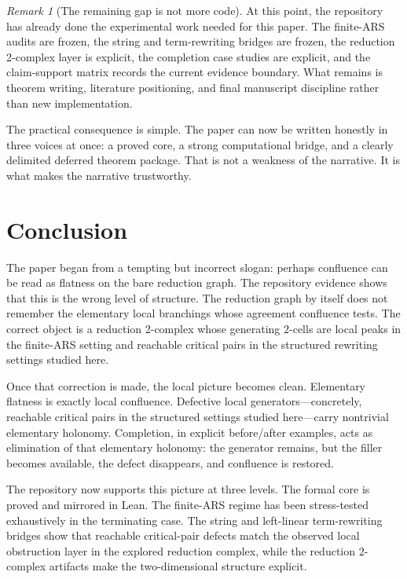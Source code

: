 \documentclass[11pt]{article}
\numberwithin{equation}{section}
\theoremstyle{definition}
\theoremstyle{remark}
\newtheorem{remark}[theorem]{Remark}
\begin{document}
\begin{remark}[The remaining gap is not more code]
\label{rem:remaining-gap-not-code}
At this point, the repository has already done the experimental work needed for this paper. The finite-ARS audits are frozen, the string and term-rewriting bridges are frozen, the reduction 2-complex layer is explicit, the completion case studies are explicit, and the claim-support matrix records the current evidence boundary. What remains is theorem writing, literature positioning, and final manuscript discipline rather than new implementation.
\end{remark}

The practical consequence is simple. The paper can now be written honestly in three voices at once: a proved core, a strong computational bridge, and a clearly delimited deferred theorem package. That is not a weakness of the narrative. It is what makes the narrative trustworthy.
 \section{Conclusion}
\label{sec:conclusion}

The paper began from a tempting but incorrect slogan: perhaps confluence can be read as flatness on the bare reduction graph. The repository evidence shows that this is the wrong level of structure. The reduction graph by itself does not remember the elementary local branchings whose agreement confluence tests. The correct object is a reduction 2-complex whose generating $2$-cells are local peaks in the finite-ARS setting and reachable critical pairs in the structured rewriting settings studied here.

Once that correction is made, the local picture becomes clean. Elementary flatness is exactly local confluence. Defective local generators---concretely, reachable critical pairs in the structured settings studied here---carry nontrivial elementary holonomy. Completion, in explicit before/after examples, acts as elimination of that elementary holonomy: the generator remains, but the filler becomes available, the defect disappears, and confluence is restored.

The repository now supports this picture at three levels. The formal core is proved and mirrored in Lean. The finite-ARS regime has been stress-tested exhaustively in the terminating case. The string and left-linear term-rewriting bridges show that reachable critical-pair defects match the observed local obstruction layer in the explored reduction complex, while the reduction 2-complex artifacts make the two-dimensional structure explicit.
\end{document}

